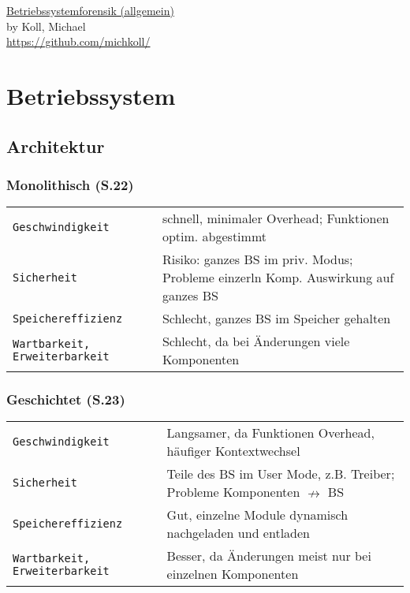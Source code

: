 \raggedright
\footnotesize
\begin{multicols}{3}	
	\setlength{\premulticols}{1pt}
	\setlength{\postmulticols}{1pt}
	\setlength{\multicolsep}{1pt}
	\setlength{\columnsep}{2pt}

\begin{center}
     \Large{\underline{Betriebssystemforensik (allgemein)}} \\
     \small by Koll, Michael \\
     \url{https://github.com/michkoll/}
\end{center}

\section{Betriebssystem}
\subsection{Architektur}
\subsubsection{Monolithisch (S.22)}
\begin{tabular}{@{}p{\the\MyLen}%
		@{}p{\linewidth-\the\MyLen}@{}}
	\texttt{Geschwindigkeit} & schnell, minimaler Overhead; Funktionen optim. abgestimmt\\
	\texttt{Sicherheit} & Risiko: ganzes BS im priv. Modus; Probleme einzerln Komp. Auswirkung auf ganzes BS\\
	\texttt{Speichereffizienz} & Schlecht, ganzes BS im Speicher gehalten\\
	\texttt{Wartbarkeit, Erweiterbarkeit} & Schlecht, da bei Änderungen viele Komponenten\\
\end{tabular}

\subsubsection{Geschichtet (S.23)}
\begin{tabular}{@{}p{\the\MyLen}%
		@{}p{\linewidth-\the\MyLen}@{}}
	\texttt{Geschwindigkeit} & Langsamer, da Funktionen Overhead, häufiger Kontextwechsel\\
	\texttt{Sicherheit} & Teile des BS im User Mode, z.B. Treiber; Probleme Komponenten $\nrightarrow$ BS\\
	\texttt{Speichereffizienz} & Gut, einzelne Module dynamisch nachgeladen und entladen\\
	\texttt{Wartbarkeit, Erweiterbarkeit} & Besser, da Änderungen meist nur bei einzelnen Komponenten\\
\end{tabular}


\end{multicols}
